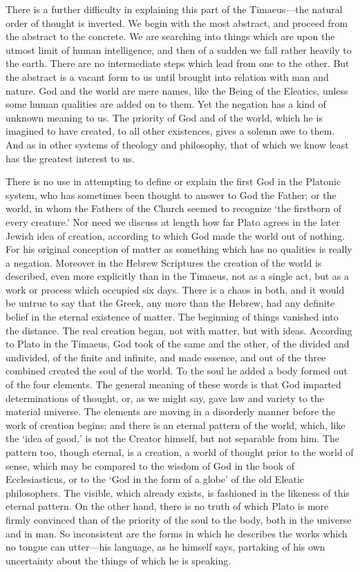 \documentclass[11pt,letter]{article}
\begin{document}
\par  There is a further difficulty in explaining this part of the Timaeus—the natural order of thought is inverted. We begin with the most abstract, and proceed from the abstract to the concrete. We are searching into things which are upon the utmost limit of human intelligence, and then of a sudden we fall rather heavily to the earth. There are no intermediate steps which lead from one to the other. But the abstract is a vacant form to us until brought into relation with man and nature. God and the world are mere names, like the Being of the Eleatics, unless some human qualities are added on to them. Yet the negation has a kind of unknown meaning to us. The priority of God and of the world, which he is imagined to have created, to all other existences, gives a solemn awe to them. And as in other systems of theology and philosophy, that of which we know least has the greatest interest to us.

\par  There is no use in attempting to define or explain the first God in the Platonic system, who has sometimes been thought to answer to God the Father; or the world, in whom the Fathers of the Church seemed to recognize ‘the firstborn of every creature.’ Nor need we discuss at length how far Plato agrees in the later Jewish idea of creation, according to which God made the world out of nothing. For his original conception of matter as something which has no qualities is really a negation. Moreover in the Hebrew Scriptures the creation of the world is described, even more explicitly than in the Timaeus, not as a single act, but as a work or process which occupied six days. There is a chaos in both, and it would be untrue to say that the Greek, any more than the Hebrew, had any definite belief in the eternal existence of matter. The beginning of things vanished into the distance. The real creation began, not with matter, but with ideas. According to Plato in the Timaeus, God took of the same and the other, of the divided and undivided, of the finite and infinite, and made essence, and out of the three combined created the soul of the world. To the soul he added a body formed out of the four elements. The general meaning of these words is that God imparted determinations of thought, or, as we might say, gave law and variety to the material universe. The elements are moving in a disorderly manner before the work of creation begins; and there is an eternal pattern of the world, which, like the ‘idea of good,’ is not the Creator himself, but not separable from him. The pattern too, though eternal, is a creation, a world of thought prior to the world of sense, which may be compared to the wisdom of God in the book of Ecclesiasticus, or to the ‘God in the form of a globe’ of the old Eleatic philosophers. The visible, which already exists, is fashioned in the likeness of this eternal pattern. On the other hand, there is no truth of which Plato is more firmly convinced than of the priority of the soul to the body, both in the universe and in man. So inconsistent are the forms in which he describes the works which no tongue can utter—his language, as he himself says, partaking of his own uncertainty about the things of which he is speaking.
\end{document}

